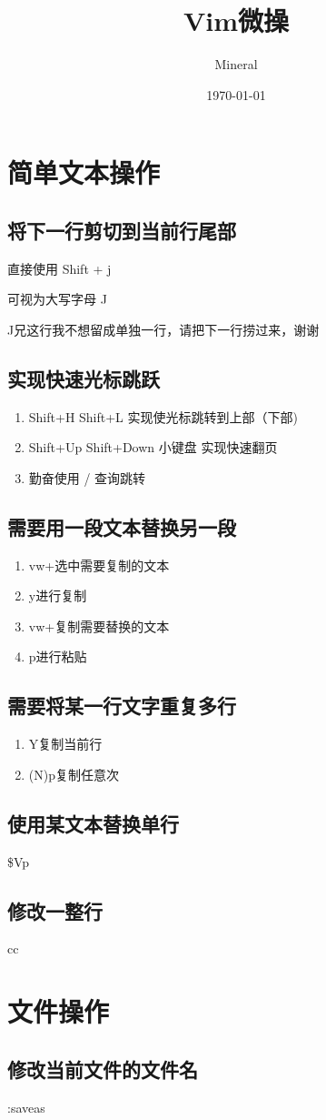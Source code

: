 \documentclass[utf8]{ctexart}
\author{Mineral}
\title{Vim微操}
\date {\today}
\begin{document}
		\maketitle
		\section{简单文本操作}
		\subsection{将下一行剪切到当前行尾部}
		\par 直接使用 Shift + j
		\par 可视为大写字母 J
		\par J兄这行我不想留成单独一行，请把下一行捞过来，谢谢		
		\subsection{实现快速光标跳跃}
		\begin{enumerate}
				\item Shift+H Shift+L 实现使光标跳转到上部（下部)
				\item Shift+Up Shift+Down 小键盘 实现快速翻页
				\item 勤奋使用 / 查询跳转	
		\end{enumerate}
		\subsection{需要用一段文本替换另一段}
		\begin{enumerate}
				\item vw+选中需要复制的文本
				\item y进行复制
				\item vw+复制需要替换的文本
				\item p进行粘贴			
		\end{enumerate}
		\subsection{需要将某一行文字重复多行}
		\begin{enumerate}
				\item Y复制当前行
				\item (N)p复制任意次
		\end{enumerate}
		\subsection{使用某文本替换单行}
		\par \Large \$Vp
		\subsection{修改一整行}
		\Large 	cc
		
		
		\section{文件操作}
		\subsection{修改当前文件的文件名}
        \Large 			:saveas
		
			
		
		
		
		
\end{document}
